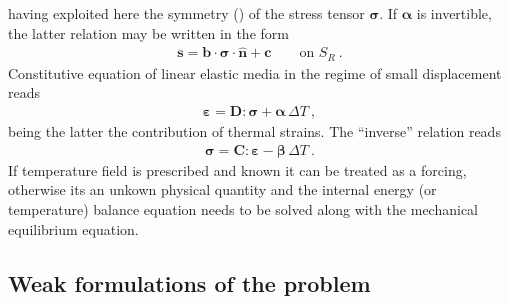 \documentclass[letterpaper,10pt,english]{jupyterBook}
\begin{document}
\sphinxAtStartPar
having exploited here the symmetry () of the stress tensor \(\boldsymbol\sigma\).
If \(\boldsymbol\alpha\) is invertible, the latter relation may be written in the form
\begin{equation*}
\begin{split}\mathbf{s} = \mathbf{b} \cdot \boldsymbol\sigma \cdot \hat{\mathbf{n}} + \mathbf{c} \qquad \text{on $S_R$} \ .\end{split}
\end{equation*}
\sphinxAtStartPar
{} Constitutive equation of linear elastic media in the regime of small displacement reads
\begin{equation*}
\begin{split}\boldsymbol\varepsilon = \mathbf{D} : \boldsymbol\sigma + \boldsymbol\alpha \, \Delta T \ ,\end{split}
\end{equation*}
\sphinxAtStartPar
being the latter the contribution of thermal strains. The “inverse” relation reads
\begin{equation*}
\begin{split}\boldsymbol\sigma = \mathbf{C} : \boldsymbol\varepsilon - \boldsymbol\beta \, \Delta T \ .\end{split}
\end{equation*}
\sphinxAtStartPar
If temperature field is prescribed and known it can be treated as a forcing, otherwise its an unkown physical quantity and the internal energy (or temperature) balance equation needs to be solved along with the mechanical equilibrium equation.


\subsection{Weak formulations of the problem}
\label{\detokenize{ch/solids/small-displacements-statics-weak-form-3d:weak-formulations-of-the-problem}}\label{\detokenize{ch/solids/small-displacements-statics-weak-form-3d:solid-mechanics-intro-small-displacements-statics-weak-form-weak}}
\end{document}
